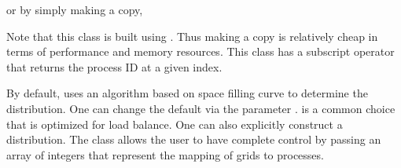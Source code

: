 \documentclass[letterpaper,10pt,english]{sphinxmanual}
\begin{document}
\sphinxAtStartPar
or by simply making a copy,

\begin{sphinxVerbatim}[commandchars=\\\{\}]
  
\end{sphinxVerbatim}

\sphinxAtStartPar
Note that this class is built using . Thus making a copy
is relatively cheap in terms of performance and memory resources. This class
has a subscript operator that returns the process ID at a given index.

\sphinxAtStartPar
By default,  uses an algorithm based on space filling
curve to determine the distribution. One can change the default via the
 parameter .   is a
common choice that is optimized for load balance.  One can also explicitly
construct a distribution.  The  class allows the user
to have complete control by passing an array of integers that represent the
mapping of grids to processes.

\begin{sphinxVerbatim}[commandchars=\\\{\}]
    
  
  
\end{sphinxVerbatim}
\end{document}

